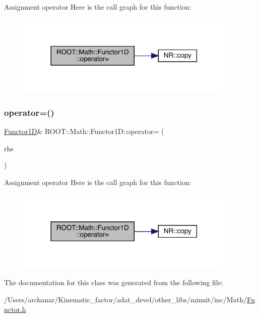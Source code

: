 Assignment operator Here is the call graph for this function\+:
\nopagebreak
\begin{figure}[H]
\begin{center}
\leavevmode
\includegraphics[width=297pt]{dc/d6d/classROOT_1_1Math_1_1Functor1D_a723dff64cd3d4e53174624fa56f30a18_cgraph}
\end{center}
\end{figure}
\mbox{\label{classROOT_1_1Math_1_1Functor1D_a723dff64cd3d4e53174624fa56f30a18}} 
\subsubsection{\texorpdfstring{operator=()}{operator=()}\hspace{0.1cm}{\footnotesize\ttfamily [2/2]}}
{\footnotesize\ttfamily \mbox{\hyperlink{classROOT_1_1Math_1_1Functor1D}{Functor1D}}\& R\+O\+O\+T\+::\+Math\+::\+Functor1\+D\+::operator= (\begin{DoxyParamCaption}\item[{const \mbox{\hyperlink{classROOT_1_1Math_1_1Functor1D}{Functor1D}} \&}]{rhs }\end{DoxyParamCaption})\hspace{0.3cm}{\ttfamily [inline]}}

Assignment operator Here is the call graph for this function\+:
\nopagebreak
\begin{figure}[H]
\begin{center}
\leavevmode
\includegraphics[width=297pt]{dc/d6d/classROOT_1_1Math_1_1Functor1D_a723dff64cd3d4e53174624fa56f30a18_cgraph}
\end{center}
\end{figure}


The documentation for this class was generated from the following file\+:\begin{DoxyCompactItemize}
\item 
/\+Users/archanar/\+Kinematic\+\_\+factor/adat\+\_\+devel/other\+\_\+libs/minuit/inc/\+Math/\mbox{\hyperlink{other__libs_2minuit_2inc_2Math_2Functor_8h}{Functor.\+h}}\end{DoxyCompactItemize}
